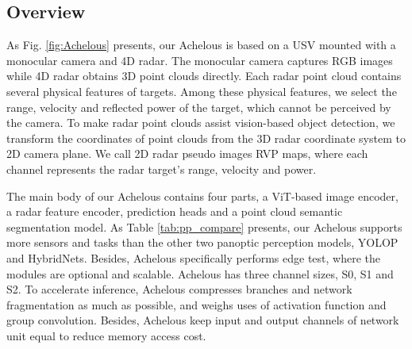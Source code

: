 \documentclass[letterpaper, 10 pt, conference]{ieeeconf}
\begin{document}
\subsection{Overview}


As Fig. \ref{fig:Achelous} presents, our Achelous is based on a USV mounted with a monocular camera and 4D radar. The monocular camera captures RGB images while 4D radar obtains 3D point clouds directly. Each radar point cloud contains several physical features of targets. Among these physical features, we select the range, velocity and reflected power of the target, which cannot be perceived by the camera. To make radar point clouds assist vision-based object detection, we transform the coordinates of point clouds from the 3D radar coordinate system to 2D camera plane. We call 2D radar pseudo images RVP maps, where each channel represents the radar target's range, velocity and power. 

The main body of our Achelous contains four parts, a ViT-based image encoder, a radar feature encoder, prediction heads and a point cloud semantic segmentation model. As Table \ref{tab:pp_compare} presents, our Achelous supports more sensors and tasks than the other two panoptic perception models, YOLOP and HybridNets. Besides, Achelous specifically performs edge test, where the modules are optional and scalable. Achelous has three channel sizes, S0, S1 and S2. To accelerate inference, Achelous compresses branches and network fragmentation as much as possible, and weighs uses of activation function and group convolution. Besides, Achelous keep input and output channels of network unit equal to reduce memory access cost.
\end{document}
